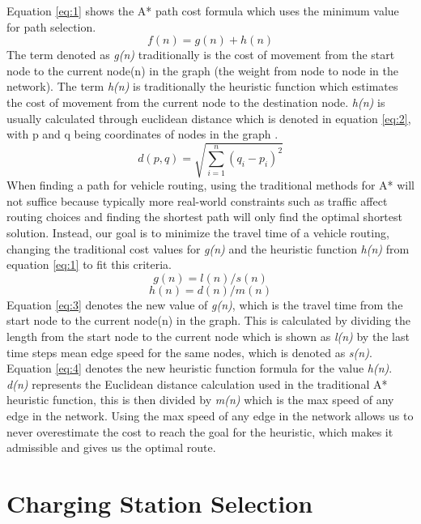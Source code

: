 \documentclass[11pt]{report}
\begin{document}
Equation \ref{eq:1} shows the A* path cost formula which uses the minimum value for path selection.
\begin{equation} \label{eq:1}
f(n)=g(n)+h(n)
\end{equation}
The term denoted as \emph{g(n)} traditionally is the cost of movement from the start node to the current node(n) in the graph (the weight from node to node in the network). The term \emph{h(n)} is traditionally the heuristic function which estimates the cost of movement from the current node to the destination node. \emph{h(n)} is usually calculated through euclidean distance which is denoted in equation \ref{eq:2}, with p and q being coordinates of nodes in the graph \autocite{pathComparison2012}.
\begin{equation} \label{eq:2}
 d\left( p,q\right)   = \sqrt {\sum _{i=1}^{n}  \left( q_{i}-p_{i}\right)^2 } 
\end{equation}
When finding a path for vehicle routing, using the traditional methods for A* will not suffice because typically more real-world constraints such as traffic affect routing choices and finding the shortest path will only find the optimal shortest solution. Instead, our goal is to minimize the travel time of a vehicle routing, changing the traditional cost values for \emph{g(n)} and the heuristic function \emph{h(n)} from equation \ref{eq:1} to fit this criteria.
\begin{equation} \label{eq:3}
    g(n)=l(n)/s(n)
\end{equation}
\begin{equation} \label{eq:4}
    h(n)=d(n)/m(n)
\end{equation}
Equation \ref{eq:3} denotes the new value of \emph{g(n)}, which is the travel time from the start node to the current node(n) in the graph. This is calculated by dividing the length from the start node to the current node which is shown as \emph{l(n)} by the last time steps mean edge speed for the same nodes, which is denoted as \emph{s(n)}. Equation \ref{eq:4} denotes the new heuristic function formula for the value \emph{h(n)}. \emph{d(n)} represents the Euclidean distance calculation used in the traditional A* heuristic function, this is then divided by \emph{m(n)} which is the max speed of any edge in the network. Using the max speed of any edge in the network allows us to never overestimate the cost to reach the goal for the heuristic, which makes it admissible and gives us the optimal route.

\section{Charging Station Selection}
\end{document}
